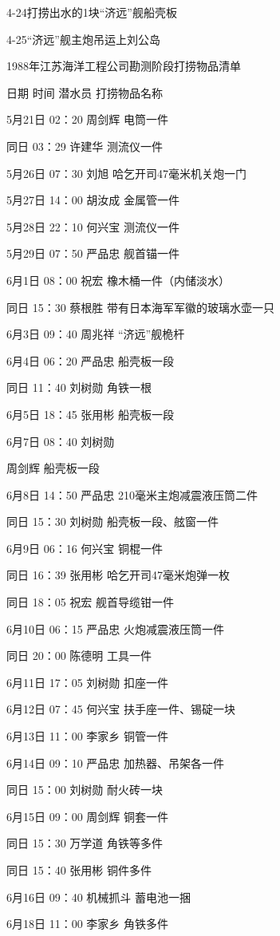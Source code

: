 \documentclass[12pt,UTF8]{ctexbook}
\begin{document}
4-24打捞出水的1块“济远”舰船壳板

4-25“济远”舰主炮吊运上刘公岛

1988年江苏海洋工程公司勘测阶段打捞物品清单

日期 时间 潜水员 打捞物品名称

5月21日 02：20 周剑辉 电筒一件

同日 03：29 许建华 测流仪一件

5月26日 07：30 刘旭 哈乞开司47毫米机关炮一门

5月27日 14：00 胡汝成 金属管一件

5月28日 22：10 何兴宝 测流仪一件

5月29日 07：50 严品忠 舰首锚一件

6月1日 08：00 祝宏 橡木桶一件（内储淡水）

同日 15：30 蔡根胜 带有日本海军军徽的玻璃水壶一只

6月3日 09：40 周兆祥 “济远”舰桅杆

6月4日 06：20 严品忠 船壳板一段

同日 11：40 刘树勋 角铁一根

6月5日 18：45 张用彬 船壳板一段

6月7日 08：40 刘树勋

周剑辉 船壳板一段

6月8日 14：50 严品忠 210毫米主炮减震液压筒二件

同日 15：30 刘树勋 船壳板一段、舷窗一件

6月9日 06：16 何兴宝 铜棍一件

同日 16：39 张用彬 哈乞开司47毫米炮弹一枚

同日 18：05 祝宏 舰首导缆钳一件

6月10日 06：15 严品忠 火炮减震液压筒一件

同日 20：00 陈德明 工具一件

6月11日 17：05 刘树勋 扣座一件

6月12日 07：45 何兴宝 扶手座一件、锡碇一块

6月13日 11：00 李家乡 铜管一件

6月14日 09：10 严品忠 加热器、吊架各一件

同日 15：00 刘树勋 耐火砖一块

6月15日 09：00 周剑辉 铜套一件

同日 15：30 万学道 角铁等多件

同日 15：40 张用彬 铜件多件

6月16日 09：40 机械抓斗 蓄电池一捆

6月18日 11：00 李家乡 角铁多件
\end{document}
